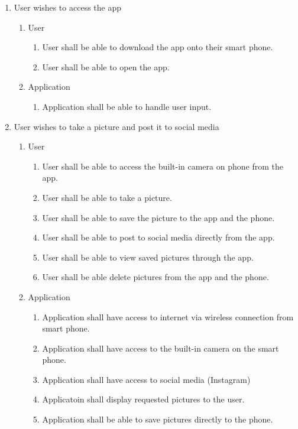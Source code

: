 \documentclass[]{article}
\begin{document}
\begin{enumerate}[{BE}1.]
	\item User wishes to access the app
	\begin{enumerate}[{VP1}.1]
		\item User
			\begin{enumerate}
				\item User shall be able to download the app onto their smart phone.
				\item User shall be able to open the app.
			\end{enumerate}
		\item Application
			\begin{enumerate}
				\item Application shall be able to handle user input.
			\end{enumerate}
	\end{enumerate}
	\item User wishes to take a picture and post it to social media
	\begin{enumerate}[{VP2}.1]
		\item User
			\begin{enumerate}
				\item User shall be able to access the built-in camera on phone from the app.
				\item User shall be able to take a picture.
				\item User shall be able to save the picture to the app and the phone.
				\item User shall be able to post to social media directly from the app.
				\item User shall be able to view saved pictures through the app.
				\item User shall be able delete pictures from the app and the phone.
			\end{enumerate}
		\item Application
			\begin{enumerate}
				\item Application shall have access to internet via wireless connection from smart phone.
				\item Application shall have access to the built-in camera on the smart phone.
				\item Application shall have access to social media (Instagram)
				\item Applicatoin shall display requested pictures to the user.
				\item Application shall be able to save pictures directly to the phone.

\end{enumerate}
\end{enumerate}
\end{enumerate}
\end{document}
